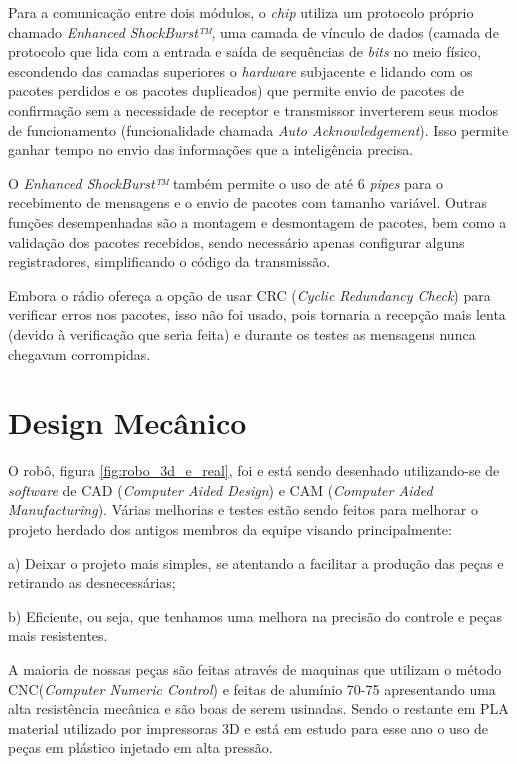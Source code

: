 \documentclass[conference]{IEEEtran}
\begin{document}
Para a comunicação entre dois módulos, o \textit{chip} utiliza um protocolo próprio chamado \textit{Enhanced ShockBurst™}, uma camada de vínculo de dados (camada de protocolo que lida com a entrada e saída de sequências de \textit{bits} no meio físico, escondendo das camadas superiores o \textit{hardware} subjacente e lidando com os pacotes perdidos e os pacotes duplicados) que permite envio de pacotes de confirmação sem a necessidade de receptor e transmissor inverterem seus modos de funcionamento (funcionalidade chamada \textit{Auto Acknowledgement}). Isso permite ganhar tempo no envio das informações que a inteligência precisa. 

O \textit{Enhanced ShockBurst™} também permite o uso de até 6 \textit{pipes} para o recebimento de mensagens e o envio de pacotes com tamanho variável. Outras funções desempenhadas são a montagem e desmontagem de pacotes, bem como a validação dos pacotes recebidos, sendo necessário apenas configurar alguns registradores, simplificando o código da transmissão.

Embora o rádio ofereça a opção de usar CRC (\textit{Cyclic Redundancy Check}) para verificar erros nos pacotes, isso não foi usado, pois tornaria a recepção mais lenta (devido à verificação que seria feita) e durante os testes as mensagens nunca chegavam corrompidas.


\section{Design Mecânico}

O robô, figura \ref{fig:robo_3d_e_real}, foi e está sendo desenhado utilizando-se de \textit{software} de CAD (\textit{Computer Aided Design}) e CAM (\textit{Computer Aided Manufacturing}). Várias melhorias e testes estão sendo feitos para melhorar o projeto herdado dos antigos membros da equipe visando principalmente:

a) Deixar o projeto mais simples, se atentando a facilitar a produção das peças e
retirando as desnecessárias;

b) Eficiente, ou seja, que tenhamos uma melhora na precisão do controle e peças
mais resistentes.

A maioria de nossas peças são feitas através de maquinas que utilizam o método CNC(\textit{Computer Numeric Control}) e feitas de alumínio 70-75 apresentando uma alta resistência mecânica e são boas de serem usinadas. Sendo o restante em PLA material utilizado por impressoras 3D e está em estudo para esse ano o uso de peças em plástico injetado em alta pressão.
\end{document}
